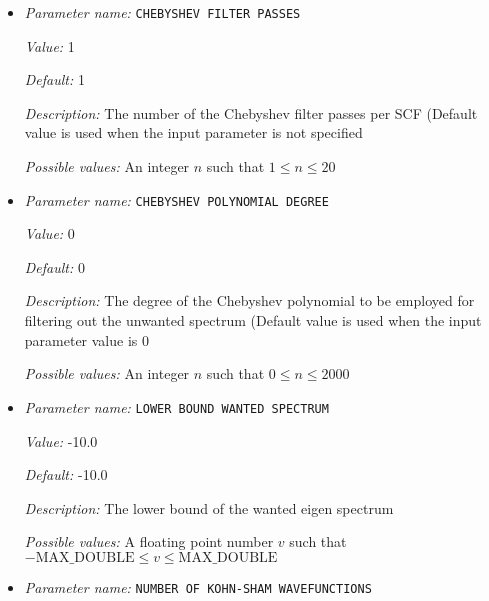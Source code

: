 \begin{itemize}
\item {\it Parameter name:} {\tt CHEBYSHEV FILTER PASSES}
\label{parameters:Eigen_2dsolver_2fChebyshev solver related parameters/CHEBYSHEV FILTER PASSES}
\label{parameters:Eigen_2dsolver_2fChebyshev_20solver_20related_20parameters/CHEBYSHEV_20FILTER_20PASSES}


{\it Value:} 1


{\it Default:} 1


{\it Description:} The number of the Chebyshev filter passes per SCF  (Default value is used when the input parameter is not specified


{\it Possible values:} An integer $n$ such that $1\leq n \leq 20$
\item {\it Parameter name:} {\tt CHEBYSHEV POLYNOMIAL DEGREE}
\label{parameters:Eigen_2dsolver_2fChebyshev solver related parameters/CHEBYSHEV POLYNOMIAL DEGREE}
\label{parameters:Eigen_2dsolver_2fChebyshev_20solver_20related_20parameters/CHEBYSHEV_20POLYNOMIAL_20DEGREE}


{\it Value:} 0


{\it Default:} 0


{\it Description:} The degree of the Chebyshev polynomial to be employed for filtering out the unwanted spectrum (Default value is used when the input parameter value is 0


{\it Possible values:} An integer $n$ such that $0\leq n \leq 2000$
\item {\it Parameter name:} {\tt LOWER BOUND WANTED SPECTRUM}
\label{parameters:Eigen_2dsolver_2fChebyshev solver related parameters/LOWER BOUND WANTED SPECTRUM}
\label{parameters:Eigen_2dsolver_2fChebyshev_20solver_20related_20parameters/LOWER_20BOUND_20WANTED_20SPECTRUM}


{\it Value:} -10.0


{\it Default:} -10.0


{\it Description:} The lower bound of the wanted eigen spectrum


{\it Possible values:} A floating point number $v$ such that $-\text{MAX\_DOUBLE} \leq v \leq \text{MAX\_DOUBLE}$
\item {\it Parameter name:} {\tt NUMBER OF KOHN-SHAM WAVEFUNCTIONS}
\label{parameters:Eigen_2dsolver_2fChebyshev solver related parameters/NUMBER OF KOHN_2dSHAM WAVEFUNCTIONS}
\label{parameters:Eigen_2dsolver_2fChebyshev_20solver_20related_20parameters/NUMBER_20OF_20KOHN_2dSHAM_20WAVEFUNCTIONS}



\end{itemize}
